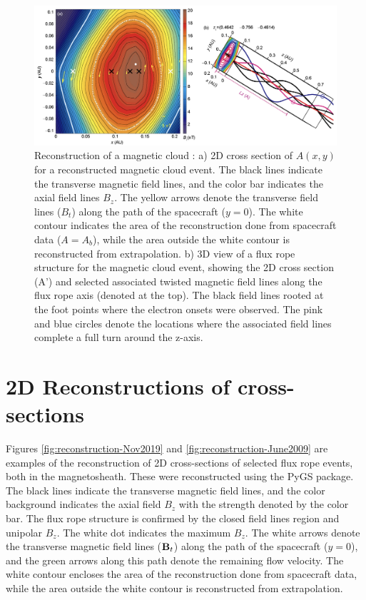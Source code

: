 \begin{figure}[ht!]
    \centering
    \includegraphics[width=\textwidth]{Figures/Reconstructions/Hu2015_GSreconstruction.png}
    \caption[GS 2D reconstruction of a magnetic cloud]{Reconstruction of a magnetic cloud \citep{Hu:2015}: a) 2D cross section of $A(x,y)$ for a reconstructed magnetic cloud event. The black lines indicate the transverse magnetic field lines, and the color bar indicates the axial field lines $B_z$. The yellow arrows denote the transverse field lines ($B_t$) along the path of the spacecraft ($y=0$). The white contour indicates the area of the reconstruction done from spacecraft data ($A=A_b$), while the area outside the white contour is reconstructed from extrapolation. b) 3D view of a flux rope structure for the magnetic cloud event, showing the 2D cross section (A') and selected associated twisted magnetic field lines along the flux rope axis (denoted at the top). The black field lines  rooted at the foot points where the electron onsets were observed. The pink and blue circles denote the locations where the associated field lines complete a full turn around the z-axis.}
    \label{fig:GSreconstruction_Hu2015}
\end{figure}

\section{2D Reconstructions of cross-sections}
Figures \ref{fig:reconstruction-Nov2019} and \ref{fig:reconstruction-June2009} are examples of the reconstruction of 2D cross-sections of selected flux rope events, both in the magnetosheath. These were reconstructed using the PyGS package. The black lines indicate the transverse magnetic field lines, and the color background indicates the axial field $B_z$ with the strength denoted by the color bar. The flux rope structure is confirmed by the closed field lines region and unipolar $B_z$. The white dot indicates the maximum $B_z$. The white arrows denote the transverse magnetic field lines ($\mathbf{B}_t$) along the path of the spacecraft ($y=0$), and the green arrows along this path denote the remaining flow velocity. The white contour encloses the area of the reconstruction done from spacecraft data, while the area outside the white contour is reconstructed from extrapolation.

